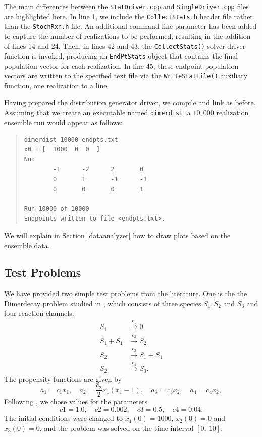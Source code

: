 \documentclass[12pt]{article}
\newcommand{\api}[1]{\texttt{#1}}
\newenvironment{code}{\begin{quote}\singlespacing}{\end{quote}}
\begin{document}
The main differences between the \api{StatDriver.cpp} and
\api{SingleDriver.cpp} files are highlighted here.  In line 1, we
include the \api{CollectStats.h} header file rather than the
\api{StochRxn.h} file.  An additional command-line parameter has been
added to capture the number of realizations to be performed, resulting
in the addition of lines 14 and 24.  Then, in lines 42 and 43, the
\api{CollectStats()} solver driver function is invoked, producing an
\api{EndPtStats} object that contains the final population vector for
each realization.  In line 45, these endpoint population vectors are
written to the specified text file via the \api{WriteStatFile()}
auxiliary function, one realization to a line.

Having prepared the distribution generator driver, we compile and link
as before.  Assuming that we create an executable named
\api{dimerdist}, a $10,000$ realization ensemble run would appear as follows:
\begin{code}
\begin{verbatim}
dimerdist 10000 endpts.txt
x0 = [  1000  0  0  ]
Nu:
        -1      -2      2       0
        0       1       -1      -1
        0       0       0       1

Run 10000 of 10000
Endpoints written to file <endpts.txt>.
\end{verbatim}
\end{code}
We will explain in Section \ref{dataanalyzer} how to
draw plots based on the ensemble data.

\subsection{Test Problems}
We have provided two simple test problems from the literature. One is the
the Dimerdecay problem studied in \cite{Gillespie01}, which
consists of three species $S_1,S_2$ and $S_3$ and four reaction channels:
\begin{equation}
\begin{aligned}
S_1 &\overset{c_1}{\rightarrow} 0 \\
S_1 + S_1 &\overset{c_2}{\rightarrow} S_2 \\
S_2 &\overset{c_3}{\rightarrow} S_1 + S_1\\
S_2 &\overset{c_4}{\rightarrow} S_3.
\end{aligned}
\label{eq_decay_dimeriz}
\end{equation}
The propensity functions are given by
$$
a_1 = c_1x_1, \quad a_2 = \frac{c_2}{2} x_1 (x_1-1), \quad a_3 = c_3 x_2, \quad a_4 = c_4 x_2,
$$
Following \cite{Gillespie01}, we chose values for the parameters
$$
c1 = 1.0, \quad c2 = 0.002, \quad c3 = 0.5, \quad c4 = 0.04.
$$
The initial conditions were changed to $x_1(0)=1000$, $x_2(0)=0$ and $x_3(0)=0$,
and the problem was solved on the time interval $[0, \ 10]$.
\end{document}
